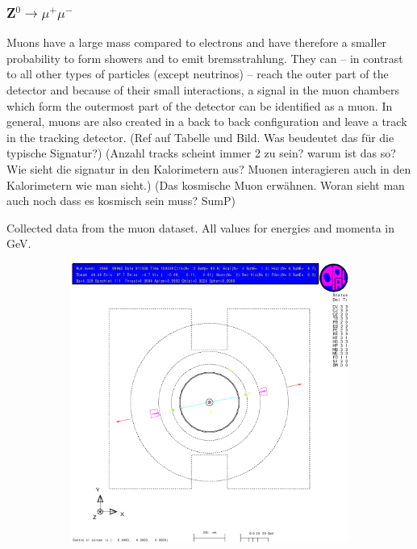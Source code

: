 \documentclass[11pt, a4paper]{article}
\numberwithin{equation}{section}
\newcommand{\korr}[1]{{\color{red}(#1)}}
\begin{document}
\subsubsection{Z$^0\rightarrow \mu^+\mu^-$}
Muons have a large mass compared to electrons and have therefore a smaller probability to form showers and to emit bremsstrahlung.
They can -- in contrast to all other types of particles (except neutrinos) -- reach the outer part of the detector and because of their small interactions, a signal in the muon chambers which form the outermost part of the detector can be identified as a muon. 
In general, muons are also created in a back to back configuration and leave a track in the tracking detector.
\korr{Ref auf Tabelle und Bild. Was beudeutet das für die typische Signatur?}
\korr{Anzahl tracks scheint immer 2 zu sein? warum ist das so? Wie sieht die signatur in den Kalorimetern aus? Muonen interagieren auch in den Kalorimetern wie man sieht.}
\korr{Das kosmische Muon erwähnen. Woran sieht man auch noch dass es kosmisch sein muss? SumP}
\begin{table}
	\centering
	
	\caption{Collected data from the muon dataset. All values for energies and momenta in \si{GeV}.}
\end{table}
\begin{figure}[h]
	\centering
	\begin{subfigure}{\textwidth}
		\centering
		\includegraphics[width=.9\textwidth]{./data/tag1/mm_pics/cropped/mm_02}
	\end{subfigure}
\end{figure}
\end{document}
